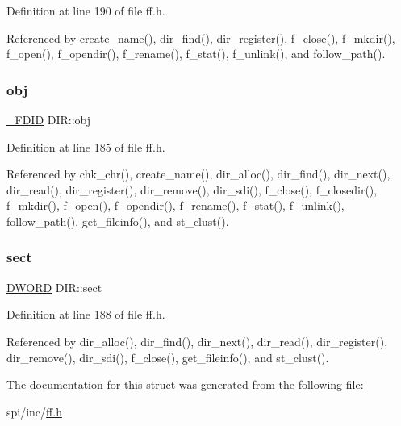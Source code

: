 Definition at line 190 of file ff.\+h.



Referenced by create\+\_\+name(), dir\+\_\+find(), dir\+\_\+register(), f\+\_\+close(), f\+\_\+mkdir(), f\+\_\+open(), f\+\_\+opendir(), f\+\_\+rename(), f\+\_\+stat(), f\+\_\+unlink(), and follow\+\_\+path().

\mbox{\label{structDIR_a5a4848c51616bf4ad90518c211ca3bb3}} 
\subsubsection{\texorpdfstring{obj}{obj}}
{\footnotesize\ttfamily \hyperlink{struct__FDID}{\+\_\+\+F\+D\+ID} D\+I\+R\+::obj}



Definition at line 185 of file ff.\+h.



Referenced by chk\+\_\+chr(), create\+\_\+name(), dir\+\_\+alloc(), dir\+\_\+find(), dir\+\_\+next(), dir\+\_\+read(), dir\+\_\+register(), dir\+\_\+remove(), dir\+\_\+sdi(), f\+\_\+close(), f\+\_\+closedir(), f\+\_\+mkdir(), f\+\_\+open(), f\+\_\+opendir(), f\+\_\+rename(), f\+\_\+stat(), f\+\_\+unlink(), follow\+\_\+path(), get\+\_\+fileinfo(), and st\+\_\+clust().

\mbox{\label{structDIR_ad01fcc812ed0dad11a593574336adc9e}} 
\subsubsection{\texorpdfstring{sect}{sect}}
{\footnotesize\ttfamily \hyperlink{integer_8h_ad342ac907eb044443153a22f964bf0af}{D\+W\+O\+RD} D\+I\+R\+::sect}



Definition at line 188 of file ff.\+h.



Referenced by dir\+\_\+alloc(), dir\+\_\+find(), dir\+\_\+next(), dir\+\_\+read(), dir\+\_\+register(), dir\+\_\+remove(), dir\+\_\+sdi(), f\+\_\+close(), get\+\_\+fileinfo(), and st\+\_\+clust().



The documentation for this struct was generated from the following file\+:\begin{DoxyCompactItemize}
\item 
spi/inc/\hyperlink{ff_8h}{ff.\+h}\end{DoxyCompactItemize}
